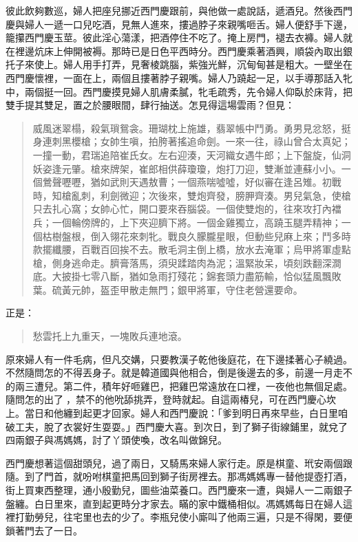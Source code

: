 彼此飲夠數巡，婦人把座兒挪近西門慶跟前，與他做一處說話，遞酒兒。然後西門慶與婦人一遞一口兒吃酒，見無人進來，摟過脖子來親嘴咂舌。婦人便舒手下邊，籠攥西門慶玉莖。彼此淫心蕩漾，把酒停住不吃了。掩上房門，褪去衣褲。婦人就在裡邊炕床上伸開被褥。那時已是日色平西時分。西門慶乘著酒興，順袋內取出銀托子來使上。婦人用手打弄，見奢棱跳腦，紫強光鮮，沉甸甸甚是粗大。一壁坐在西門慶懷裡，一面在上，兩個且摟著脖子親嘴。婦人乃蹺起一足，以手導那話入牝中，兩個挺一回。西門慶摸見婦人肌膚柔膩，牝毛疏秀，先令婦人仰臥於床背，把雙手提其雙足，置之於腰眼間，肆行抽送。怎見得這場雲雨？但見：
\begin{quote}
威風迷翠榻，殺氣瑣鴛衾。珊瑚枕上施雄，翡翠帳中鬥勇。勇男見忿怒，挺身連刺黑櫻槍；女帥生嗔，拍胯著搖追命劍。一來一往，祿山曾合太真妃；一撞一動，君瑞追陪崔氏女。左右迎湊，天河織女遇牛郎；上下盤旋，仙洞妖姿逢元肇。槍來牌架，崔郎相供薛瓊瓊，炮打刀迎，雙漸並連蘇小小。一個鶯聲嚦嚦，猶如武則天遇敖曹；一個燕喘噓噓，好似審在逢呂雉。初戰時，知槍亂刺，利劍微迎；次後來，雙炮齊發，膀胛齊湊。男兒氣急，使槍只去扎心窩；女帥心忙，開口要來吞腦袋。一個使雙炮的，往來攻打內襠兵；一個輪傍牌的，上下夾迎臍下將。一個金雞獨立，高蹺玉腿弄精神；一個枯樹盤根，倒入翎花來刺牝。戰良久朦朧星眼，但動些兒麻上來；鬥多時款擺纖腰，百戰百回挨不去。散毛洞主倒上橋，放水去淹軍；烏甲將軍虛點槍，側身逃命走。臍膏落馬，須臾蹂踏肉為泥；溫緊妝呆，頃刻跌翻深澗底。大披掛七零八斷，猶如急雨打殘花；錦套頭力盡筋輸，恰似猛風飄敗葉。硫黃元帥，盔歪甲散走無門；銀甲將軍，守住老營還要命。
\end{quote}
正是：
\begin{quote}
愁雲托上九重天，一塊敗兵連地滾。
\end{quote}

原來婦人有一件毛病，但凡交媾，只要教漢子乾他後庭花，在下邊揉著心子繞過。不然隨問怎的不得丟身子。就是韓道國與他相合，倒是後邊去的多，前邊一月走不的兩三遭兒。第二件，積年好咂雞巴，把雞巴常遠放在口裡，一夜他也無個足處。隨問怎的出了𣬽，禁不的他吮舔挑弄，登時就起。自這兩椿兒，可在西門慶心坎上。當日和他纏到起更才回家。婦人和西門慶說：「爹到明日再來早些，白日里咱破工夫，脫了衣裳好生耍耍。」西門慶大喜。到次日，到了獅子街線鋪里，就兌了四兩銀子與馮媽媽，討了丫頭使喚，改名叫做錦兒。

西門慶想著這個甜頭兒，過了兩日，又騎馬來婦人家行走。原是棋童、玳安兩個跟隨。到了門首，就吩咐棋童把馬回到獅子街房裡去。那馮媽媽專一替他提壺打酒，街上買東西整理，通小殷勤兒，圖些油菜養口。西門慶來一遭，與婦人一二兩銀子盤纏。白日里來，直到起更時分才家去。瞞的家中鐵桶相似。馮媽媽每日在婦人這裡打勤勞兒，往宅里也去的少了。李瓶兒使小廝叫了他兩三遍，只是不得閑，要便鎖著門去了一日。

